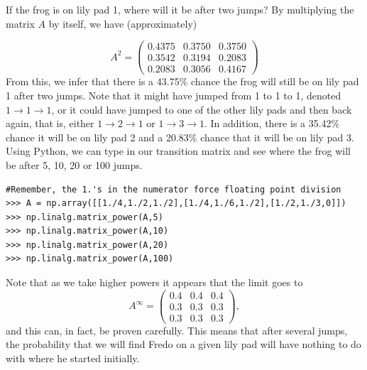 If the frog is on lily pad 1, where will it be after two jumps?
By multiplying the matrix $A$ by itself, we have (approximately)

\[
A^2 = \begin{pmatrix}
0.4375 & 0.3750 & 0.3750\\
0.3542 & 0.3194 & 0.2083\\
0.2083 & 0.3056 & 0.4167
\end{pmatrix}
\]
From this, we infer that there is a 43.75\% chance the frog will still be on lily pad 1 after two jumps.
Note that it might have jumped from 1 to 1 to 1, denoted $1 \rightarrow 1 \rightarrow 1$, or it could have jumped to one of the other lily pads and then back again, that is, either $1 \rightarrow 2 \rightarrow 1$ or $1 \rightarrow 3 \rightarrow 1$.
In addition, there is a 35.42\% chance it will be on lily pad 2 and a 20.83\% chance that it will be on lily pad 3.
Using Python, we can type in our transition matrix and see where the frog will be after 5, 10, 20 or 100 jumps.

\begin{lstlisting}
#Remember, the 1.'s in the numerator force floating point division
>>> A = np.array([[1./4,1./2,1./2],[1./4,1./6,1./2],[1./2,1./3,0]])
>>> np.linalg.matrix_power(A,5)
>>> np.linalg.matrix_power(A,10)
>>> np.linalg.matrix_power(A,20)
>>> np.linalg.matrix_power(A,100)
\end{lstlisting}

Note that as we take higher powers it appears that the limit goes to
\[
A^\infty = \begin{pmatrix}
0.4 & 0.4 & 0.4\\
0.3 & 0.3 & 0.3\\
0.3 & 0.3 & 0.3
\end{pmatrix},
\]
and this can, in fact, be proven carefully.
This means that after several jumps, the probability that we will find Fredo on a given lily pad will have nothing to do with where he started initially.


